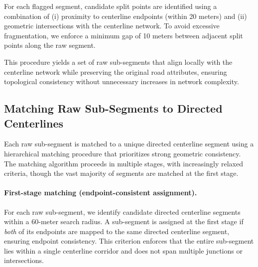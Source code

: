\documentclass[12pt]{article}
\begin{document}
	For each flagged segment, candidate split points are identified using a combination of (i) proximity to centerline endpoints (within 20 meters) and (ii) geometric intersections with the centerline network. To avoid excessive fragmentation, we enforce a minimum gap of 10 meters between adjacent split points along the raw segment.
	
	This procedure yields a set of raw sub-segments that align locally with the centerline network while preserving the original road attributes, ensuring topological consistency without unnecessary increases in network complexity.
	
	\subsection{Matching Raw Sub-Segments to Directed Centerlines}
	
	Each raw sub-segment is matched to a unique directed centerline segment using a hierarchical matching procedure that prioritizes strong geometric consistency. The matching algorithm proceeds in multiple stages, with increasingly relaxed criteria, though the vast majority of segments are matched at the first stage.
	
	\paragraph{First-stage matching (endpoint-consistent assignment).}
	For each raw sub-segment, we identify candidate directed centerline segments within a 60-meter search radius. A sub-segment is assigned at the first stage if \emph{both} of its endpoints are mapped to the same directed centerline segment, ensuring endpoint consistency. This criterion enforces that the entire sub-segment lies within a single centerline corridor and does not span multiple junctions or intersections.
	
\end{document}
